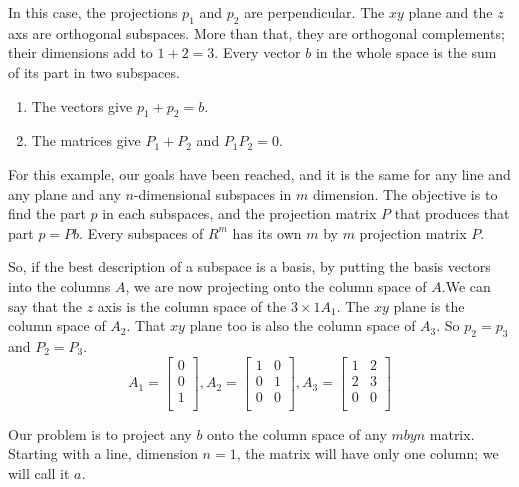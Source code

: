 In this case, the projections \(p_1\) and \(p_2\) are perpendicular. The \(xy\) plane and the \(z\) axs are orthogonal subspaces. More than that, they are orthogonal complements; their dimensions add to \(1 + 2 = 3\). Every vector \(b\) in the whole space is the sum of its part in two subspaces. 
\begin{enumerate}
    \item The vectors give \(p_1 + p_2 = b\).
    \item The matrices give \(P_1 + P_2\) and \(P_{1}P_{2}=0\).   
\end{enumerate}

For this example, our goals have been reached, and it is the same for any line and any plane and any \(n\)-dimensional subspaces in \(m\) dimension. The objective is to find the part \(p\) in each subspaces, and the projection matrix \(P\) that produces that part \(p = Pb\). Every subspaces of \(R^m\) has its own \(m\) by \(m\) projection matrix \(P\). 

So, if the best description of a subspace is a basis, by putting the basis vectors into the columns \(A\), we are now projecting onto the column space of \(A\).We can say that the \(z\) axis is the column space of the \(3 \times 1 A_1\). The \(xy\) plane is the column space of \(A_2\). That \(xy\) plane too is also the column space of \(A_3\). So \(p_2 = p_3\) and \(P_2 = P_3\). 
\[
    A_1 = 
    \begin{bmatrix}
         0 \\
         0 \\
         1 \\
    \end{bmatrix}
    , A_2 = 
    \begin{bmatrix}
        1 & 0  \\
        0 & 1  \\
        0 & 0  \\
    \end{bmatrix}
    , A_3 = 
    \begin{bmatrix}
        1 & 2  \\
        2 & 3  \\
        0 & 0 \\
    \end{bmatrix}
\]          

Our problem is to project any \(b\) onto the column space of any \(m by n\) matrix. Starting with a line, dimension \(n = 1\), the matrix will have only one column; we will call it \(a\). 

